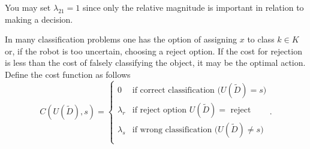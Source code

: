 \begin{example}
\begin{enumerate}
		You may set $\lambda_{21}=1$ since only the relative magnitude is important in relation to making a decision.
		
	\end{enumerate}
	
	
\end{example}


\begin{example}
	In many classification problems one has the option of assigning $x$ to class $k\in K$ or, if the robot is too uncertain, choosing a reject option. If the cost for rejection is less than the cost of falsely classifying the object, it may be the optimal action. Define the cost function as follows
	\begin{equation}
		C(U(\tilde{D}),s)=\begin{cases}
			0 & \text{if correct classification ($U(\tilde{D})=s$)}\\
			\lambda_r & \text{if reject option $U(\tilde{D})=$ reject}\\
			\lambda_s & \text{if wrong classification ($U(\tilde{D})\neq s$)}\\
		\end{cases}.
	\end{equation}
	

\end{example}
